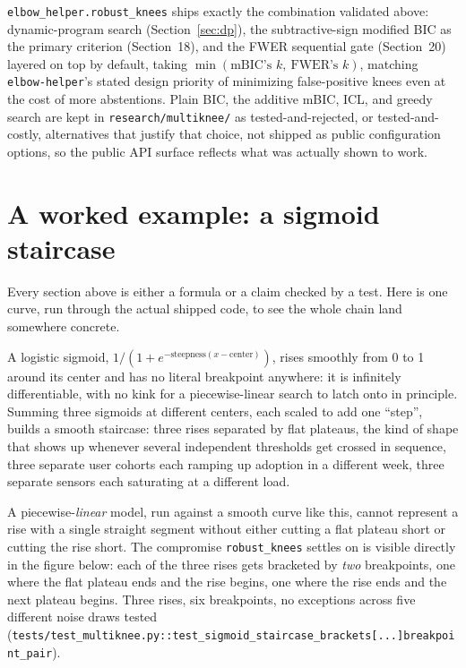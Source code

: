 \documentclass[11pt]{article}
\newcommand{\code}[1]{\texttt{#1}}
\begin{document}
\code{elbow\_helper.robust\_knees} ships exactly the combination validated
above: dynamic-program search (Section~\ref{sec:dp}), the subtractive-sign
modified BIC as the primary criterion (Section~18), and the FWER
sequential gate (Section~20) layered on top by default, taking
$\min(\text{mBIC's } k,\ \text{FWER's } k)$, matching \code{elbow-helper}'s
stated design priority of minimizing false-positive knees even at the cost
of more abstentions. Plain BIC, the additive mBIC, ICL, and greedy search
are kept in \code{research/multiknee/} as tested-and-rejected, or
tested-and-costly, alternatives that justify that choice, not shipped as
public configuration options, so the public API surface reflects what was
actually shown to work.

\section{A worked example: a sigmoid staircase}

Every section above is either a formula or a claim checked by a test. Here
is one curve, run through the actual shipped code, to see the whole chain
land somewhere concrete.

A logistic sigmoid, $1/(1+e^{-\text{steepness}(x-\text{center})})$, rises
smoothly from 0 to 1 around its center and has no literal breakpoint
anywhere: it is infinitely differentiable, with no kink for a
piecewise-linear search to latch onto in principle. Summing three sigmoids
at different centers, each scaled to add one ``step'', builds a smooth
staircase: three rises separated by flat plateaus, the kind of shape that
shows up whenever several independent thresholds get crossed in sequence,
three separate user cohorts each ramping up adoption in a different week,
three separate sensors each saturating at a different load.

A piecewise-\emph{linear} model, run against a smooth curve like this,
cannot represent a rise with a single straight segment without either
cutting a flat plateau short or cutting the rise short. The compromise
\code{robust\_knees} settles on is visible directly in the figure below:
each of the three rises gets bracketed by \emph{two} breakpoints, one where
the flat plateau ends and the rise begins, one where the rise ends and the
next plateau begins. Three rises, six breakpoints, no exceptions across
five different noise draws tested
(\code{tests/test\_multiknee.py::\allowbreak test\_sigmoid\_staircase\_brackets[...]breakpoint\_pair}).
\end{document}
